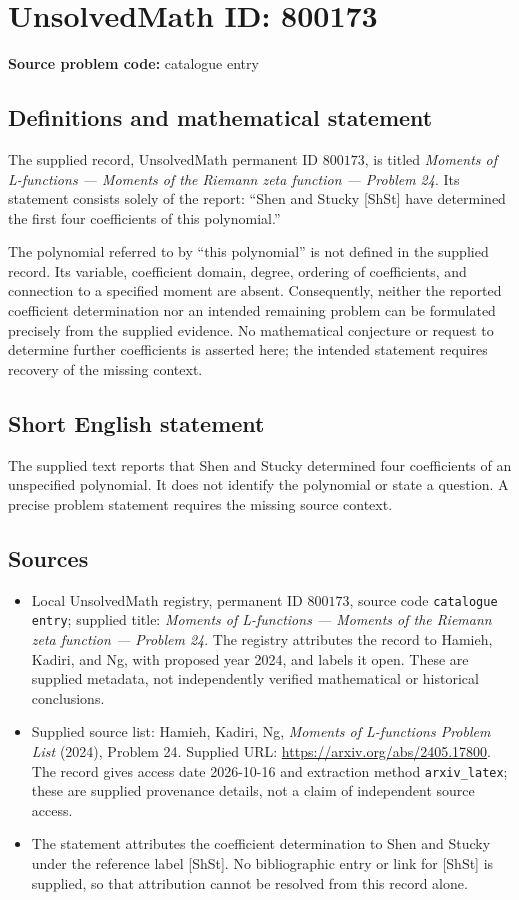 \documentclass[11pt]{article}
\begin{document}
\section*{UnsolvedMath ID: 800173}
\textbf{Source problem code:} catalogue entry
\subsection{Definitions and mathematical statement}
The supplied record, UnsolvedMath permanent ID \(800173\), is titled \emph{Moments of L-functions --- Moments of the Riemann zeta function --- Problem 24}. Its statement consists solely of the report: ``Shen and Stucky [ShSt] have determined the first four coefficients of this polynomial.''

The polynomial referred to by ``this polynomial'' is not defined in the supplied record. Its variable, coefficient domain, degree, ordering of coefficients, and connection to a specified moment are absent. Consequently, neither the reported coefficient determination nor an intended remaining problem can be formulated precisely from the supplied evidence. No mathematical conjecture or request to determine further coefficients is asserted here; the intended statement requires recovery of the missing context.
\subsection{Short English statement}
The supplied text reports that Shen and Stucky determined four coefficients of an unspecified polynomial. It does not identify the polynomial or state a question. A precise problem statement requires the missing source context.
\subsection{Sources}
\begin{itemize}
\item Local UnsolvedMath registry, permanent ID \(800173\), source code \texttt{catalogue entry}; supplied title: \emph{Moments of L-functions --- Moments of the Riemann zeta function --- Problem 24}. The registry attributes the record to Hamieh, Kadiri, and Ng, with proposed year 2024, and labels it open. These are supplied metadata, not independently verified mathematical or historical conclusions.
\item Supplied source list: Hamieh, Kadiri, Ng, \emph{Moments of L-functions Problem List} (2024), Problem 24. Supplied URL: \url{https://arxiv.org/abs/2405.17800}. The record gives access date 2026-10-16 and extraction method \texttt{arxiv\_latex}; these are supplied provenance details, not a claim of independent source access.
\item The statement attributes the coefficient determination to Shen and Stucky under the reference label [ShSt]. No bibliographic entry or link for [ShSt] is supplied, so that attribution cannot be resolved from this record alone.
\end{itemize}
\end{document}
